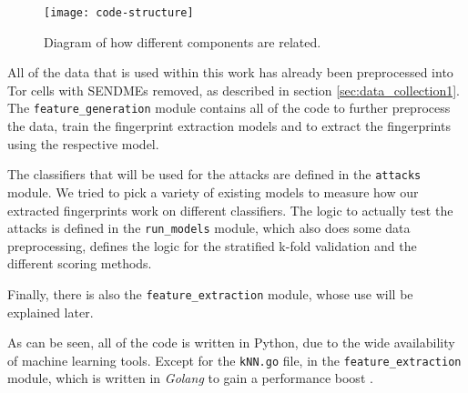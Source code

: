 \begin{figure}[ht]
  \centering
  \texttt{[image: code-structure]}
  \caption{Diagram of how different components are related.}
  \label{fig:code-structure}
\end{figure}

All of the data that is used within this work has already been preprocessed into Tor cells with SENDMEs removed, as described in section \ref{sec:data_collection1}.
The \texttt{feature\_generation} module contains all of the code to further preprocess the data, train the fingerprint extraction models and to extract the fingerprints using the respective model.

The classifiers that will be used for the attacks are defined in the \texttt{attacks} module.
We tried to pick a variety of existing models to measure how our extracted fingerprints work on different classifiers.
The logic to actually test the attacks is defined in the \texttt{run\_models} module, which also does some data preprocessing, defines the logic for the stratified k-fold validation and the different scoring methods.

\newpage

Finally, there is also the \texttt{feature\_extraction} module, whose use will be explained later.

As can be seen, all of the code is written in Python, due to the wide availability of machine learning tools.
Except for the \texttt{kNN.go} file, in the \texttt{feature\_extraction} module, which is written in \textit{Golang} to gain a performance boost \cite{gokNN}.
